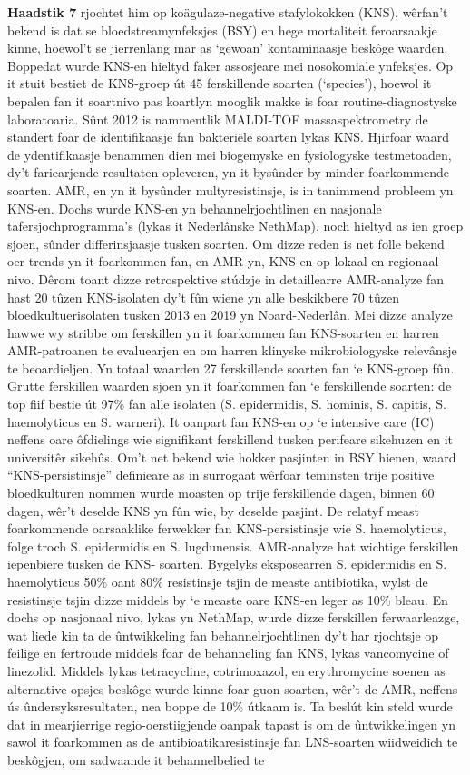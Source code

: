 \documentclass[
]{book}
\begin{document}
\textbf{Haadstik 7} rjochtet him op koägulaze-negative stafylokokken (KNS), wêrfan't bekend is dat se bloedstreamynfeksjes (BSY) en hege mortaliteit feroarsaakje kinne, hoewol't se jierrenlang mar as `gewoan' kontaminaasje beskôge waarden. Boppedat wurde KNS-en hieltyd faker assosjeare mei nosokomiale ynfeksjes. Op it stuit bestiet de KNS-groep út 45 ferskillende soarten (`species'), hoewol it bepalen fan it soartnivo pas koartlyn mooglik makke is foar routine-diagnostyske laboratoaria. Sûnt 2012 is nammentlik MALDI-TOF massaspektrometry de standert foar de identifikaasje fan bakteriële soarten lykas KNS. Hjirfoar waard de ydentifikaasje benammen dien mei biogemyske en fysiologyske testmetoaden, dy't fariearjende resultaten opleveren, yn it bysûnder by minder foarkommende soarten. AMR, en yn it bysûnder multyresistinsje, is in tanimmend probleem yn KNS-en. Dochs wurde KNS-en yn behannelrjochtlinen en nasjonale tafersjochprogramma's (lykas it Nederlânske NethMap), noch hieltyd as ien groep sjoen, sûnder differinsjaasje tusken soarten. Om dizze reden is net folle bekend oer trends yn it foarkommen fan, en AMR yn, KNS-en op lokaal en regionaal nivo. Dêrom toant dizze retrospektive stúdzje in detaillearre AMR-analyze fan hast 20 tûzen KNS-isolaten dy't fûn wiene yn alle beskikbere 70 tûzen bloedkultuerisolaten tusken 2013 en 2019 yn Noard-Nederlân. Mei dizze analyze hawwe wy stribbe om ferskillen yn it foarkommen fan KNS-soarten en harren AMR-patroanen te evaluearjen en om harren klinyske mikrobiologyske relevânsje te beoardieljen. Yn totaal waarden 27 ferskillende soarten fan `e KNS-groep fûn. Grutte ferskillen waarden sjoen yn it foarkommen fan `e ferskillende soarten: de top fiif bestie út 97\% fan alle isolaten (S. epidermidis, S. hominis, S. capitis, S. haemolyticus en S. warneri). It oanpart fan KNS-en op `e intensive care (IC) neffens oare ôfdielings wie signifikant ferskillend tusken perifeare sikehuzen en it universitêr sikehûs. Om't net bekend wie hokker pasjinten in BSY hienen, waard ``KNS-persistinsje'' definieare as in surrogaat wêrfoar teminsten trije positive bloedkulturen nommen wurde moasten op trije ferskillende dagen, binnen 60 dagen, wêr't deselde KNS yn fûn wie, by deselde pasjint. De relatyf meast foarkommende oarsaaklike ferwekker fan KNS-persistinsje wie S. haemolyticus, folge troch S. epidermidis en S. lugdunensis. AMR-analyze hat wichtige ferskillen iepenbiere tusken de KNS- soarten. Bygelyks eksposearren S. epidermidis en S. haemolyticus 50\% oant 80\% resistinsje tsjin de measte antibiotika, wylst de resistinsje tsjin dizze middels by `e measte oare KNS-en leger as 10\% bleau. En dochs op nasjonaal nivo, lykas yn NethMap, wurde dizze ferskillen ferwaarleazge, wat liede kin ta de ûntwikkeling fan behannelrjochtlinen dy't har rjochtsje op feilige en fertroude middels foar de behanneling fan KNS, lykas vancomycine of linezolid. Middels lykas tetracycline, cotrimoxazol, en erythromycine soenen as alternative opsjes beskôge wurde kinne foar guon soarten, wêr't de AMR, neffens ús ûndersyksresultaten, nea boppe de 10\% útkaam is. Ta beslút kin steld wurde dat in mearjierrige regio-oerstiigjende oanpak tapast is om de ûntwikkelingen yn sawol it foarkommen as de antibioatikaresistinsje fan LNS-soarten wiidweidich te beskôgjen, om sadwaande it behannelbelied te 
\end{document}
